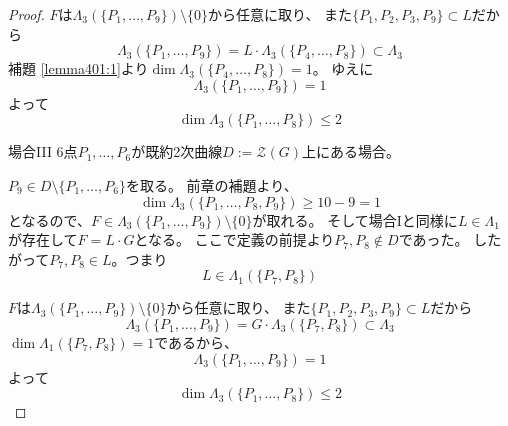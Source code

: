 \documentclass[a4]{article}
\begin{document}
\begin{proof}
            $F$は$\Lambda_3(\{P_1, \dots, P_9 \}) \setminus \{0\}$から任意に取り、
            また$\{P_1, P_2, P_3, P_9\} \subset L$だから
            \[ \Lambda_3(\{P_1, \dots, P_9 \})=L \cdot \Lambda_3(\{P_4, \dots, P_8 \}) \subset \Lambda_3 \]
            補題 \ref{lemma401:1}より$\dim \Lambda_3(\{P_4, \dots, P_8 \})=1$。
            ゆえに
            \[ \Lambda_3(\{P_1, \dots, P_9 \})=1 \]
            よって
            \[ \dim \Lambda_3(\{P_1, \dots, P_8 \}) \leq 2 \]

            \begin{itembox}[l]{場合III}
                6点$P_1, \dots, P_6$が既約2次曲線$D:=\mathcal{Z}(G)$上にある場合。
            \end{itembox}
            $P_9 \in D \setminus \{P_1, \dots, P_6\}$を取る。
            前章の補題より、
            \[ \dim \Lambda_3(\{P_1, \dots, P_8, P_9 \}) \geq 10-9=1 \]
            となるので、$F \in \Lambda_3(\{P_1, \dots, P_9 \}) \setminus \{0\}$が取れる。
            そして場合Iと同様に$L \in \Lambda_1$が存在して$F=L \cdot G$となる。
            ここで定義の前提より$P_7, P_8 \not \in D$であった。
            したがって$P_7, P_8 \in L$。つまり
            \[ L \in \Lambda_1(\{P_7, P_8 \}) \]

            $F$は$\Lambda_3(\{P_1, \dots, P_9 \}) \setminus \{0\}$から任意に取り、
            また$\{P_1, P_2, P_3, P_9\} \subset L$だから
            \[ \Lambda_3(\{P_1, \dots, P_9 \})=G \cdot \Lambda_3(\{P_7, P_8 \}) \subset \Lambda_3 \]
            $\dim \Lambda_1(\{P_7, P_8 \})=1$であるから、
            \[ \Lambda_3(\{P_1, \dots, P_9 \})=1 \]
            よって
            \[ \dim \Lambda_3(\{P_1, \dots, P_8 \}) \leq 2 \]
        \end{proof}
\end{document}
